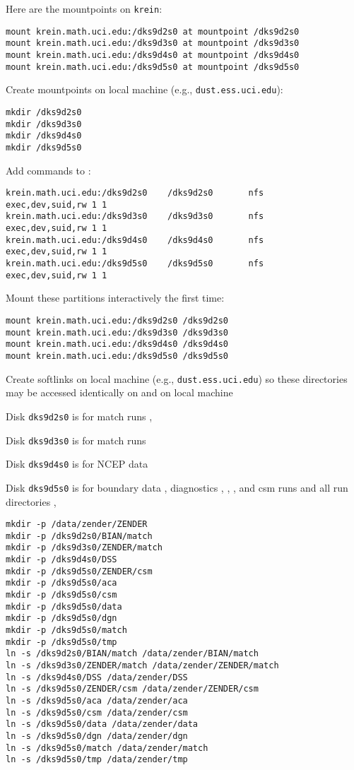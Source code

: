 \documentclass[12pt,twoside]{article}
\begin{document}
Here are the mountpoints on \verb'krein':
\begin{verbatim}
mount krein.math.uci.edu:/dks9d2s0 at mountpoint /dks9d2s0
mount krein.math.uci.edu:/dks9d3s0 at mountpoint /dks9d3s0
mount krein.math.uci.edu:/dks9d4s0 at mountpoint /dks9d4s0
mount krein.math.uci.edu:/dks9d5s0 at mountpoint /dks9d5s0
\end{verbatim}
Create mountpoints on local machine (e.g., \verb'dust.ess.uci.edu'):
\begin{verbatim}
mkdir /dks9d2s0
mkdir /dks9d3s0
mkdir /dks9d4s0
mkdir /dks9d5s0
\end{verbatim}
Add  commands to :
\begin{verbatim}
krein.math.uci.edu:/dks9d2s0    /dks9d2s0       nfs      exec,dev,suid,rw 1 1
krein.math.uci.edu:/dks9d3s0    /dks9d3s0       nfs      exec,dev,suid,rw 1 1
krein.math.uci.edu:/dks9d4s0    /dks9d4s0       nfs      exec,dev,suid,rw 1 1
krein.math.uci.edu:/dks9d5s0    /dks9d5s0       nfs      exec,dev,suid,rw 1 1
\end{verbatim}
Mount these partitions interactively the first time:
\begin{verbatim}
mount krein.math.uci.edu:/dks9d2s0 /dks9d2s0
mount krein.math.uci.edu:/dks9d3s0 /dks9d3s0
mount krein.math.uci.edu:/dks9d4s0 /dks9d4s0
mount krein.math.uci.edu:/dks9d5s0 /dks9d5s0
\end{verbatim}
Create softlinks on local machine (e.g., \verb'dust.ess.uci.edu') so
these directories may be accessed identically on  and on
local machine 
\begin{enumerate*}
\item Disk \verb'dks9d2s0' is for match runs , 
\item Disk \verb'dks9d3s0' is for match runs 
\item Disk \verb'dks9d4s0' is for NCEP data 
\item Disk \verb'dks9d5s0' is for boundary data ,
diagnostics , ,
, and csm runs  and all run  
directories , 
\end{enumerate*}
\begin{verbatim}
mkdir -p /data/zender/ZENDER
mkdir -p /dks9d2s0/BIAN/match
mkdir -p /dks9d3s0/ZENDER/match
mkdir -p /dks9d4s0/DSS
mkdir -p /dks9d5s0/ZENDER/csm
mkdir -p /dks9d5s0/aca
mkdir -p /dks9d5s0/csm
mkdir -p /dks9d5s0/data
mkdir -p /dks9d5s0/dgn
mkdir -p /dks9d5s0/match
mkdir -p /dks9d5s0/tmp
ln -s /dks9d2s0/BIAN/match /data/zender/BIAN/match 
ln -s /dks9d3s0/ZENDER/match /data/zender/ZENDER/match 
ln -s /dks9d4s0/DSS /data/zender/DSS
ln -s /dks9d5s0/ZENDER/csm /data/zender/ZENDER/csm 
ln -s /dks9d5s0/aca /data/zender/aca
ln -s /dks9d5s0/csm /data/zender/csm
ln -s /dks9d5s0/data /data/zender/data
ln -s /dks9d5s0/dgn /data/zender/dgn
ln -s /dks9d5s0/match /data/zender/match
ln -s /dks9d5s0/tmp /data/zender/tmp
\end{verbatim}
\end{document}
